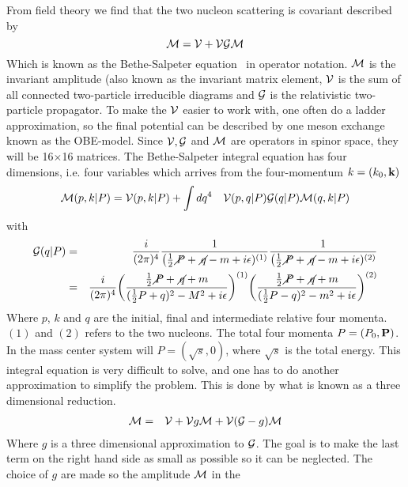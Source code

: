 From field theory we find that the
two nucleon scattering is covariant described by
\begin{equation}
{\cal M}={\cal V}+{\cal V}{\cal G}{\cal M}
\end{equation}
Which is known as the Bethe-Salpeter equation~\cite{Bhete-Salpeter} in operator notation.
${\cal M}$ is the invariant amplitude (also known as the invariant matrix element,
${\cal V}$ is the sum of all connected two-particle irreducible diagrams and ${\cal G}$
is the relativistic two-particle propagator. To make the ${\cal V}$ easier to work with, one
often do a ladder approximation, so the final potential can be described by one meson exchange known
as the OBE-model. Since ${\cal V}, {\cal G}$ and ${\cal M}$ are operators in spinor space, they will
be 16$\times$16 matrices. The Bethe-Salpeter integral equation has four dimensions, i.e. four variables
which arrives from the four-momentum $k=(k_0,{{\bf k}})$
\begin{equation}
{\cal M}(p,k|P)={\cal V}(p,k|P)+\int dq^4\quad{\cal V}(p,q|P){\cal G}(q|P){\cal M}(q,k|P)
\end{equation}
with
\begin{eqnarray}\label{eq:Gintegralelkmfs} 
{\cal G}(q|P)&=&\frac{i}{(2\pi)^4}\frac{1}{\big(\frac{1}{2} \diagup\!\!\!\! P+\diagup\!\!\!\! q-m+i\epsilon)^{(1)}}
\frac{1}{\big(\frac{1}{2} \diagup\!\!\!\! P+\diagup\!\!\!\! q-m+i\epsilon)^{(2)}}\nonumber\\ 
&=&
\frac{i}{(2\pi)^4}\bigg(\frac{\frac{1}{2} \diagup\!\!\!\! P+\diagup\!\!\!\! q+m}{(\frac{1}{2}P+q)^2-M^2+i\epsilon}\bigg)^{(1)}
\bigg(\frac{\frac{1}{2} \diagup\!\!\!\! P+\diagup\!\!\!\! q+m}{(\frac{1}{2}P-q)^2-m^2+i\epsilon}\bigg)^{(2)}
\end{eqnarray}
Where $p$, $k$ and $q$ are the initial, final and intermediate relative four momenta. $(1)$ and $(2)$ refers to the 
two nucleons. 
The total four momenta 
$P=(P_0,{\bf P})$. In the mass center system will $P=(\sqrt{s},0)$, where $\sqrt{s}$ is the total energy.
This integral equation
is very difficult to solve, and one has to do another approximation to simplify the problem. This is done by   
what is known as a three dimensional reduction.
\begin{eqnarray}
{\cal M}&=&{\cal V}+{\cal V}{g}{\cal M}+{\cal V}({\cal G}-g){\cal M}
\end{eqnarray}
Where $g$ is a three dimensional approximation to ${\cal G}$. 
The goal is to make the last term on the right hand side as small as possible so it can be neglected.
The choice of $g$ are made so the amplitude ${\cal M}$ in the
